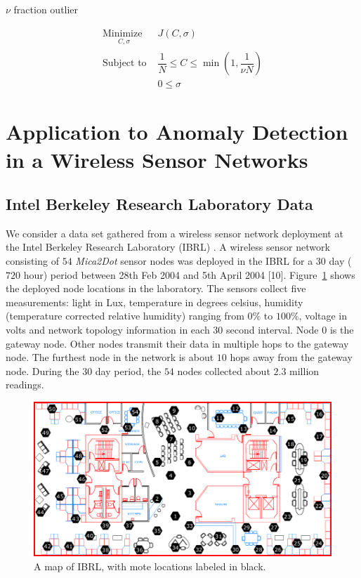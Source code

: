 \documentclass[3p,times]{elsarticle}
\begin{document}
$\nu$ fraction outlier

\begin{subequations}
\begin{align}
\underset{
	\begin{array}{c}
		 C, \sigma
	\end{array}}{\text{Minimize }} & J\left( C, \sigma \right)\\
\text{Subject to } & \dfrac{1}{N} \le C \le \min \left( 1, \dfrac{1}{\nu N} \right) \\
& 0 \le \sigma
\end{align}
\end{subequations}

\section{Application to Anomaly Detection in a Wireless Sensor Networks}

\subsection{Intel Berkeley Research Laboratory Data}

We consider a data set gathered from a wireless sensor network deployment at the Intel Berkeley Research Laboratory (IBRL) \cite{Buonadonna2005}. A wireless sensor network consisting of $54$ \emph{Mica2Dot} sensor nodes was deployed in the IBRL for a $30$ day ($720$ hour) period between 28th Feb 2004 and 5th April 2004 [10]. Figure~\ref{fig:ibrl_wsn} shows the deployed node locations in the laboratory. The sensors collect five measurements: light in Lux, temperature in degrees celsius, humidity (temperature corrected relative humidity) ranging from $0\%$ to $100\%$, voltage in volts and network topology information in each $30$ second interval. Node $0$ is the gateway node. Other nodes transmit their data in multiple hops to the gateway node. The furthest node in the network is about $10$ hops away from the gateway node. During the $30$ day period, the $54$ nodes collected about $2.3$ million readings.

\begin{figure}[H]
\centering
\includegraphics[scale=.3]{Pictures/ibrl_wsn}
\caption{A map of IBRL, with mote locations labeled in black.}
\label{fig:ibrl_wsn}
\end{figure}
\end{document}
